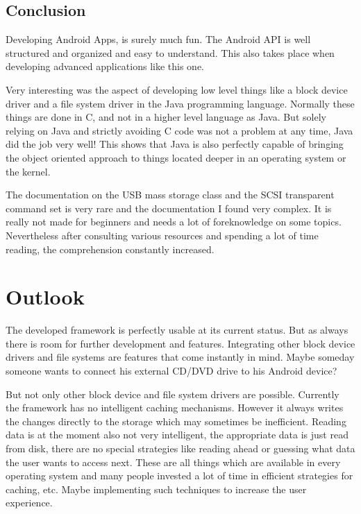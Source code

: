 \section{Conclusion}

Developing Android Apps, is surely much fun. The Android API is well structured and organized and easy to understand. This also takes place when developing advanced applications like this one. 

Very interesting was the aspect of developing low level things like a block device driver and a file system driver in the Java programming language. Normally these things are done in C, and not in a higher level language as Java. But solely relying on Java and strictly avoiding C code was not a problem at any time, Java did the job very well! This shows that Java is also perfectly capable of bringing the object oriented approach to things located deeper in an operating system or the kernel.

The documentation on the USB mass storage class and the SCSI transparent command set is very rare and the documentation I found very complex. It is really not made for beginners and needs a lot of foreknowledge on some topics. Nevertheless after consulting various resources and spending a lot of time reading, the comprehension constantly increased.

\chapter{Outlook}

The developed framework is perfectly usable at its current status. But as always there is room for further development and features. Integrating other block device drivers and file systems are features that come instantly in mind. Maybe someday someone wants to connect his external CD/DVD drive to his Android device?

But not only other block device and file system drivers are possible. Currently the framework has no intelligent caching mechanisms. However it always writes the changes directly to the storage which may sometimes be inefficient. Reading data is at the moment also not very intelligent, the appropriate data is just read from disk, there are no special strategies like reading ahead or guessing what data the user wants to access next. These are all things which are available in every operating system and many people invested a lot of time in efficient strategies for caching, etc. Maybe implementing such techniques to increase the user experience.

